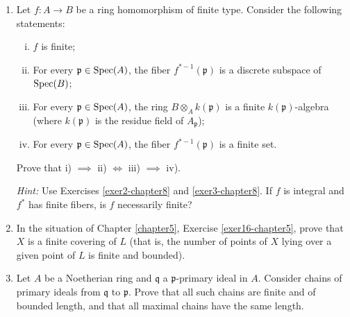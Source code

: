 \begin{enumerate}
    \item \label{exer4-chapter8}Let $f \colon A \to B$ be a ring homomorphism of finite type. Consider the following statements:
    \begin{enumerate}[i)]
        \item $f$ is finite;
        \item For every $\mathfrak{p} \in \operatorname{Spec}(A)$, the fiber $f^{*-1}(\mathfrak{p})$ is a discrete subspace of $\operatorname{Spec}(B)$;
        \item For every $\mathfrak{p} \in \operatorname{Spec}(A)$, the ring $B \otimes_A k(\mathfrak{p})$ is a finite $k(\mathfrak{p})$-algebra (where $k(\mathfrak{p})$ is the residue field of $A_{\mathfrak{p}}$);
        \item For every $\mathfrak{p} \in \operatorname{Spec}(A)$, the fiber $f^{*-1}(\mathfrak{p})$ is a finite set.
    \end{enumerate}
    Prove that i) $\implies$ ii) $\iff$ iii) $\implies$ iv).

    \textit{Hint:} Use Exercises \ref{exer2-chapter8} and \ref{exer3-chapter8}.
    If $f$ is integral and $f^*$ has finite fibers, is $f$ necessarily finite?

    \item \label{exer5-chapter8}In the situation of Chapter \ref{chapter5}, Exercise \ref{exer16-chapter5}, prove that $X$ is a finite covering of $L$ (that is, the number of points of $X$ lying over a given point of $L$ is finite and bounded).

    \item \label{exer6-chapter8}Let $A$ be a Noetherian ring and $\mathfrak{q}$ a $\mathfrak{p}$-primary ideal in $A$. Consider chains of primary ideals from $\mathfrak{q}$ to $\mathfrak{p}$. Prove that all such chains are finite and of bounded length, and that all maximal chains have the same length.
\end{enumerate}
